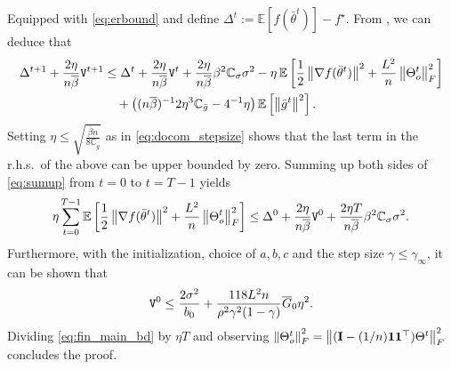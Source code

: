 \documentclass[10pt]{article} %
\theoremstyle{plain}
\theoremstyle{definition}
\theoremstyle{remark}
\newcommand{\prm}{\theta}
\newcommand{\avgg}{\bar{g}}
\newcommand{\avgtheta}{\bar{\prm}}
\newcommand{\norm}[1]{\left\| #1 \right\|}
\newcommand{\I}{{\bf I}}
\newcommand{\ER}{{\tt V}}
\newcommand{\avggrdF}{\overline{\nabla F}}
\newcommand{\ConstS}{\mathbb{C}_\sigma}
\newcommand{\ConstG}{\mathbb{C}_{\avgg}}
\newcommand{\InitG}{\overline{G}_0}
\newcommand{\avgv}{\bar{v}}
\newcommand{\brho}{\overline{\beta}}
\newcommand{\redtmp}{}
\begin{document}
Equipped with \eqref{eq:erbound} and define $\Delta^t := \mathbb{E} [ f( \avgtheta^t )] - f^\star$. From , we can deduce that \vspace{-.1cm}
\begin{align}
    \Delta^{t+1} + \frac{2\eta}{n \brho} \ER^{t+1} &\leq \Delta^{t} + \frac{2\eta}{n \brho} \ER^{t} + \frac{2 \eta}{n \brho} \beta^2 \ConstS \sigma^2 - \eta \, \mathbb{E} \left[ \frac{1}{2} \norm{\nabla f(\avgtheta^t)}^2 + \frac{L^2}{n} \norm{\Theta_o^t}_F^2 \right]\label{eq:sumup} \\
    & \quad+ \left( ({ n \brho })^{-1} {2 \eta^3} \ConstG - 4^{-1} {\eta}  \right) \mathbb{E} \left[ \norm{\avgg^t}^2 \right]. \nonumber 
\end{align}
Setting $\eta \leq \sqrt{ \frac{\brho n}{ 8 \ConstG } }$ as in \eqref{eq:docom_stepsize} shows that the last term in the r.h.s.~of the above can be upper bounded by zero. Summing up both sides of \eqref{eq:sumup} from $t=0$ to $t=T-1$ yields \vspace{-.1cm}
\begin{equation}
    \eta \sum_{t=0}^{T-1} \mathbb{E} \left[ \frac{1}{2} \norm{\nabla f(\avgtheta^t)}^2 + \frac{L^2}{n} \norm{\Theta_o^t}_F^2 
    \right] \leq \Delta^0 + \frac{2\eta}{n \brho} \ER^{0} + \frac{2 \eta T}{n \brho} \beta^2 \ConstS \sigma^2 .\label{eq:fin_main_bd} 
\end{equation}
Furthermore, with the initialization, choice of $a,b,c$ and the step size $\gamma \leq \gamma_\infty$, it can be shown that \vspace{-.1cm}
\begin{align} \label{eq:er0}
    \ER^0 \leq \frac{2 \sigma^2}{b_0} + \frac{{\redtmp 118} L^2 n}{{ \rho^2 \gamma^2 (1-\gamma)}} \InitG \eta^2.
\end{align}
Dividing \eqref{eq:fin_main_bd} by $\eta T$ and observing $\norm{\Theta_o^t}_F^2 = \norm{ ( \I - (1/n) {\bf 1} {\bf 1}^\top ) \Theta^t }_F^2$ concludes the proof.
\end{document}
